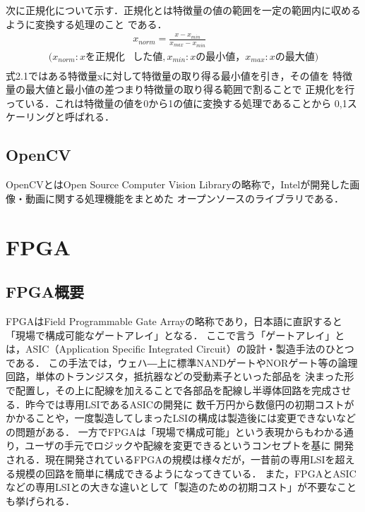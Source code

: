 \documentclass[11pt,a4j]{jreport}
\begin{document}
次に正規化について示す．正規化とは特徴量の値の範囲を一定の範囲内に収めるように変換する処理のこと
である．
\begin{equation}
  \begin{split}
  &x_{norm} = \frac{x-x_{min}}{x_{max}-x_{min}} \\
  (x_{norm}:xを正規化&した値, x_{min}:xの最小値，x_{max}:xの最大値) \\
  \end{split}
\end{equation}
式2.1ではある特徴量xに対して特徴量の取り得る最小値を引き，その値を
特徴量の最大値と最小値の差つまり特徴量の取り得る範囲で割ることで
正規化を行っている．これは特徴量の値を0から1の値に変換する処理であることから
0,1スケーリングと呼ばれる．

\subsection{OpenCV}
OpenCVとはOpen Source Computer Vision Libraryの略称で，Intelが開発した画像・動画に関する処理機能をまとめた
オープンソースのライブラリである．

\section{FPGA}
\subsection{FPGA概要}
FPGAはField Programmable Gate Arrayの略称であり，日本語に直訳すると「現場で構成可能なゲートアレイ」となる．
ここで言う「ゲートアレイ」とは，ASIC（Application Specific Integrated Circuit）の設計・製造手法のひとつである．
この手法では，ウェハ―上に標準NANDゲートやNORゲート等の論理回路，単体のトランジスタ，抵抗器などの受動素子といった部品を
決まった形で配置し，その上に配線を加えることで各部品を配線し半導体回路を完成させる．昨今では専用LSIであるASICの開発に
数千万円から数億円の初期コストがかかることや，一度製造してしまったLSIの構成は製造後には変更できないなどの問題がある．
一方でFPGAは「現場で構成可能」という表現からもわかる通り，ユーザの手元でロジックや配線を変更できるというコンセプトを基に
開発される．現在開発されているFPGAの規模は様々だが，一昔前の専用LSIを超える規模の回路を簡単に構成できるようになってきている．
また，FPGAとASICなどの専用LSIとの大きな違いとして「製造のための初期コスト」が不要なことも挙げられる．
\end{document}
